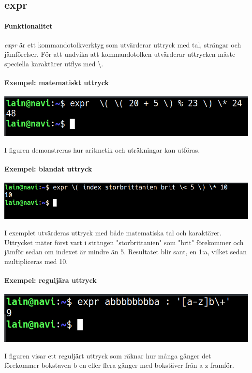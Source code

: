 \subsection{expr}
\paragraph{Funktionalitet}
\emph{expr} är ett kommandotolkverktyg som utvärderar uttryck med tal, strängar och jämförelser. För att undvika att kommandotolken utvärderar uttrycken måste speciella karaktärer utflys med \textbackslash. 
\paragraph{Exempel: matematiskt uttryck}
\begin{center}
        \includegraphics[width=\linewidth]{bilder/expr_matte.png}
\end{center}
I figuren demonstreras hur aritmetik och uträkningar kan utföras.
\paragraph{Exempel: blandat uttryck}
\begin{center}
        \includegraphics[width=\linewidth]{bilder/expr_blandat.png}
\end{center}
I exemplet utvärderas uttryck med både matematiska tal och karaktärer. Uttrycket mäter först vart i strängen "storbrittanien" som "brit" förekommer och jämför sedan om indexet är mindre än 5. Resultatet blir sant, en 1:a, vilket sedan multipliceras med 10.  
\paragraph{Exempel: reguljära uttryck}
\begin{center}
        \includegraphics[width=\linewidth]{bilder/expr_regular.png}
\end{center}
I figuren visar ett reguljärt uttryck som räknar hur många gånger det förekommer bokstaven b en eller flera gånger med bokstäver från a-z framför.
